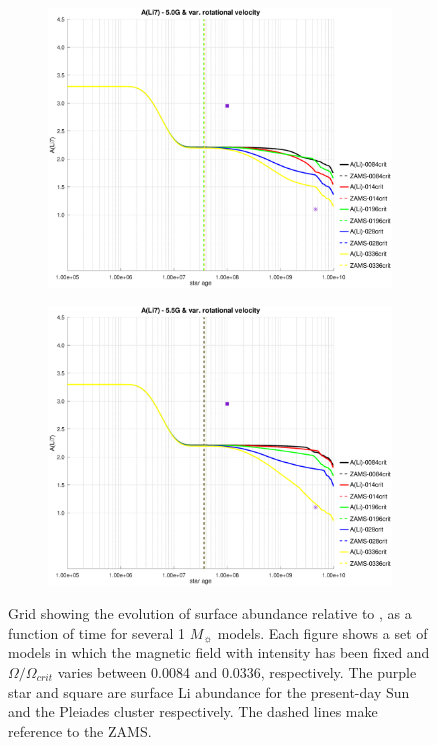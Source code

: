 \documentclass[fleqn,usenatbib]{mnras}
\begin{document}
\begin{figure}
    \begin{subfigure}[h]{0.47\textwidth}
    \includegraphics[trim = 35mm 15mm 20mm 15mm, clip,width=\textwidth]{figures/li_var_vel_5_0g.eps}
    \label{fig:subim5}
    \end{subfigure}
    \begin{subfigure}[h]{0.47\textwidth}
    \includegraphics[trim = 35mm 15mm 20mm 15mm, clip,width=\textwidth]{figures/li_var_vel_5_5g.eps}
    \label{fig:subim6}
    \end{subfigure}
\caption{Grid showing the evolution of surface  abundance relative to , as a function of time for several 1 $M_{\sun}$ models. Each figure shows a set of models in which the magnetic field with intensity has been fixed and $\Omega / \Omega_{crit}$ varies between 0.0084 and 0.0336, respectively. The purple star and square are surface Li abundance for the present-day Sun \citep{Asplund2009} and the Pleiades cluster \citep{Sestito2005} respectively. The dashed lines make reference to the ZAMS.}
\label{fig:grid_li_var_vel}
\end{figure}
\par
\end{document}
